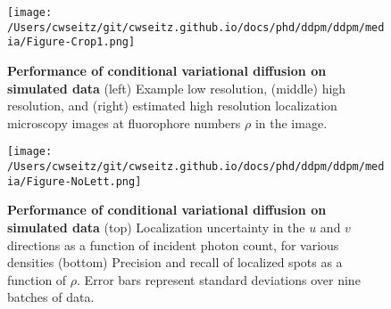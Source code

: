 

\begin{figure}[t]
\centering
\texttt{[image: /Users/cwseitz/git/cwseitz.github.io/docs/phd/ddpm/ddpm/media/Figure-Crop1.png]}
\caption{\textbf{Performance of conditional variational diffusion on simulated data} (left) Example low resolution, (middle) high resolution, and (right) estimated high resolution localization microscopy images at fluorophore numbers $\rho$ in the image.}
\label{fig:cvdmsim1}
\end{figure}

\begin{figure}[t]
\centering
\texttt{[image: /Users/cwseitz/git/cwseitz.github.io/docs/phd/ddpm/ddpm/media/Figure-NoLett.png]}
\caption{\textbf{Performance of conditional variational diffusion on simulated data} (top) Localization uncertainty in the $u$ and $v$ directions as a function of incident photon count, for various densities (bottom) Precision and recall of localized spots as a function of $\rho$. Error bars represent standard deviations over nine batches of data. }
\label{fig:cvdmsim2}
\end{figure}



